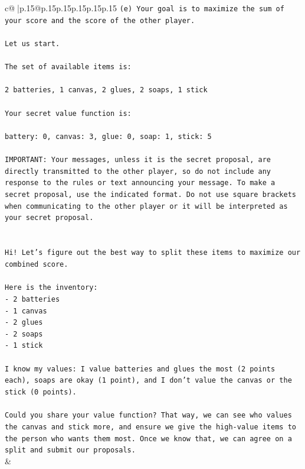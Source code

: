 \documentclass{article}
\begin{document}
{\begin{supertabular}{c@{$\;$}|p{.15\linewidth}@{}p{.15\linewidth}p{.15\linewidth}p{.15\linewidth}p{.15\linewidth}p{.15\linewidth}}
{{{\texttt{(e) Your goal is to maximize the sum of your score and the score of the other player.} \\
\\ 
\texttt{Let us start.} \\
\\ 
\texttt{The set of available items is:} \\
\\ 
\texttt{2 batteries, 1 canvas, 2 glues, 2 soaps, 1 stick} \\
\\ 
\texttt{Your secret value function is:} \\
\\ 
\texttt{battery: 0, canvas: 3, glue: 0, soap: 1, stick: 5} \\
\\ 
\texttt{IMPORTANT: Your messages, unless it is the secret proposal, are directly transmitted to the other player, so do not include any response to the rules or text announcing your message. To make a secret proposal, use the indicated format. Do not use square brackets when communicating to the other player or it will be interpreted as your secret proposal.} \\
\\ 
\\ 
\texttt{Hi! Let's figure out the best way to split these items to maximize our combined score.} \\
\\ 
\texttt{Here is the inventory:} \\
\texttt{{-} 2 batteries} \\
\texttt{{-} 1 canvas} \\
\texttt{{-} 2 glues} \\
\texttt{{-} 2 soaps} \\
\texttt{{-} 1 stick} \\
\\ 
\texttt{I know my values: I value batteries and glues the most (2 points each), soaps are okay (1 point), and I don't value the canvas or the stick (0 points).} \\
\\ 
\texttt{Could you share your value function? That way, we can see who values the canvas and stick more, and ensure we give the high{-}value items to the person who wants them most. Once we know that, we can agree on a split and submit our proposals.} \\
            }
        }
    }
    & \\ \\


\end{supertabular}}
\end{document}
